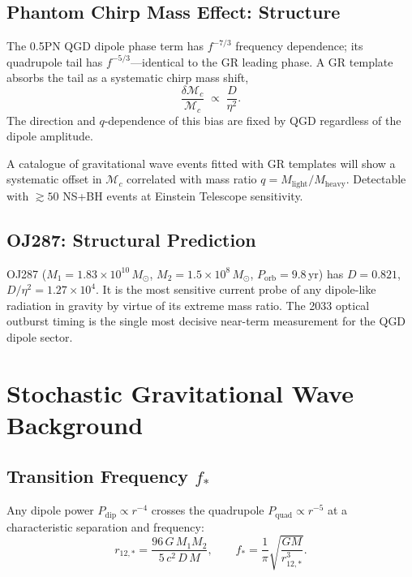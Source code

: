 \documentclass[12pt,a4paper]{article}
\newcommand{\Msun}{M_{\odot}}
\begin{document}
\subsection{Phantom Chirp Mass Effect: Structure}

The 0.5PN QGD dipole phase term has $f^{-7/3}$ frequency dependence;
its quadrupole tail has $f^{-5/3}$---identical to the GR leading phase.
A GR template absorbs the tail as a systematic chirp mass shift,
\begin{equation}
  \frac{\delta\mathcal{M}_c}{\mathcal{M}_c}\;\propto\;\frac{D}{\eta^2}.
\end{equation}
The direction and $q$-dependence of this bias are fixed by QGD regardless
of the dipole amplitude.

\begin{prediction}
A catalogue of gravitational wave events fitted with GR templates will
show a systematic offset in $\mathcal{M}_c$ correlated with mass ratio
$q=M_{\mathrm{light}}/M_{\mathrm{heavy}}$.
Detectable with $\gtrsim50$ NS+BH events at Einstein Telescope sensitivity.
\end{prediction}

\subsection{OJ287: Structural Prediction}

OJ287 ($M_1=1.83\times10^{10}\,\Msun$, $M_2=1.5\times10^8\,\Msun$,
$P_{\mathrm{orb}}=9.8\,$yr) has $D=0.821$, $D/\eta^2=1.27\times10^4$.
It is the most sensitive current probe of any dipole-like radiation in
gravity by virtue of its extreme mass ratio.
The 2033 optical outburst timing is the single most decisive near-term
measurement for the QGD dipole sector.

\section{Stochastic Gravitational Wave Background}

\subsection{Transition Frequency $f_*$}

Any dipole power $P_{\mathrm{dip}}\propto r^{-4}$ crosses the quadrupole
$P_{\mathrm{quad}}\propto r^{-5}$ at a characteristic separation and frequency:
\begin{equation}
  r_{12,*} = \frac{96\,G\,M_1 M_2}{5\,c^2\,D\,M},
  \qquad
  f_* = \frac{1}{\pi}\sqrt{\frac{GM}{r_{12,*}^3}}.
\end{equation}
\end{document}
